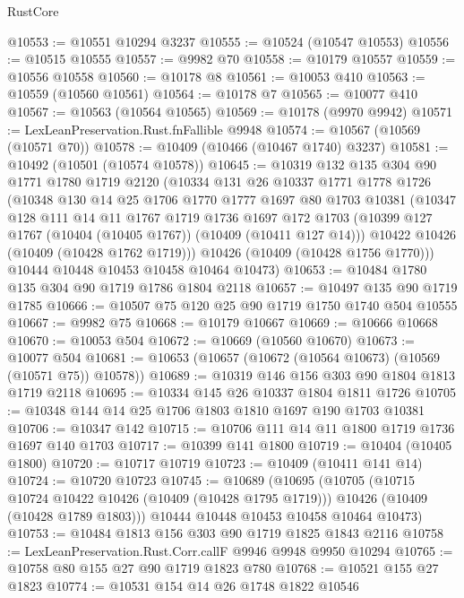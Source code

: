 \begin{lexlean}{RustCore}
\begin{coremodule}
@10553 := @10551 @10294 @3237
@10555 := @10524 (@10547 @10553)
@10556 := @10515 @10555
@10557 := @9982 @70
@10558 := @10179 @10557
@10559 := @10556 @10558
@10560 := @10178 @8
@10561 := @10053 @410
@10563 := @10559 (@10560 @10561)
@10564 := @10178 @7
@10565 := @10077 @410
@10567 := @10563 (@10564 @10565)
@10569 := @10178 (@9970 @9942)
@10571 := LexLeanPreservation.Rust.fnFallible @9948
@10574 := @10567 (@10569 (@10571 @70))
@10578 := @10409 (@10466 (@10467 @1740) @3237)
@10581 := @10492 (@10501 (@10574 @10578))
@10645 := @10319
    @132
    @135
    @304
    @90
    @1771
    @1780
    @1719
    @2120
    (@10334
      @131
      @26
      @10337
      @1771
      @1778
      @1726
      (@10348
        @130
        @14
        @25
        @1706
        @1770
        @1777
        @1697
        @80
        @1703
        @10381
        (@10347
          @128
          @111
          @14
          @11
          @1767
          @1719
          @1736
          @1697
          @172
          @1703
          (@10399 @127 @1767 (@10404 (@10405 @1767)) (@10409 (@10411 @127 @14)))
          @10422
          @10426
          (@10409 (@10428 @1762 @1719)))
        @10426
        (@10409 (@10428 @1756 @1770)))
      @10444
      @10448
      @10453
      @10458
      @10464
      @10473)
@10653 := @10484 @1780 @135 @304 @90 @1719 @1786 @1804 @2118
@10657 := @10497 @135 @90 @1719 @1785
@10666 := @10507 @75 @120 @25 @90 @1719 @1750 @1740 @504 @10555
@10667 := @9982 @75
@10668 := @10179 @10667
@10669 := @10666 @10668
@10670 := @10053 @504
@10672 := @10669 (@10560 @10670)
@10673 := @10077 @504
@10681 := @10653 (@10657 (@10672 (@10564 @10673) (@10569 (@10571 @75)) @10578))
@10689 := @10319 @146 @156 @303 @90 @1804 @1813 @1719 @2118
@10695 := @10334 @145 @26 @10337 @1804 @1811 @1726
@10705 := @10348 @144 @14 @25 @1706 @1803 @1810 @1697 @190 @1703 @10381
@10706 := @10347 @142
@10715 := @10706 @111 @14 @11 @1800 @1719 @1736 @1697 @140 @1703
@10717 := @10399 @141 @1800
@10719 := @10404 (@10405 @1800)
@10720 := @10717 @10719
@10723 := @10409 (@10411 @141 @14)
@10724 := @10720 @10723
@10745 := @10689
    (@10695
      (@10705
        (@10715 @10724 @10422 @10426 (@10409 (@10428 @1795 @1719)))
        @10426
        (@10409 (@10428 @1789 @1803)))
      @10444
      @10448
      @10453
      @10458
      @10464
      @10473)
@10753 := @10484 @1813 @156 @303 @90 @1719 @1825 @1843 @2116
@10758 := LexLeanPreservation.Rust.Corr.callF @9946 @9948 @9950 @10294
@10765 := @10758 @80 @155 @27 @90 @1719 @1823 @780
@10768 := @10521 @155 @27 @1823
@10774 := @10531 @154 @14 @26 @1748 @1822 @10546

\end{coremodule}
\end{lexlean}
